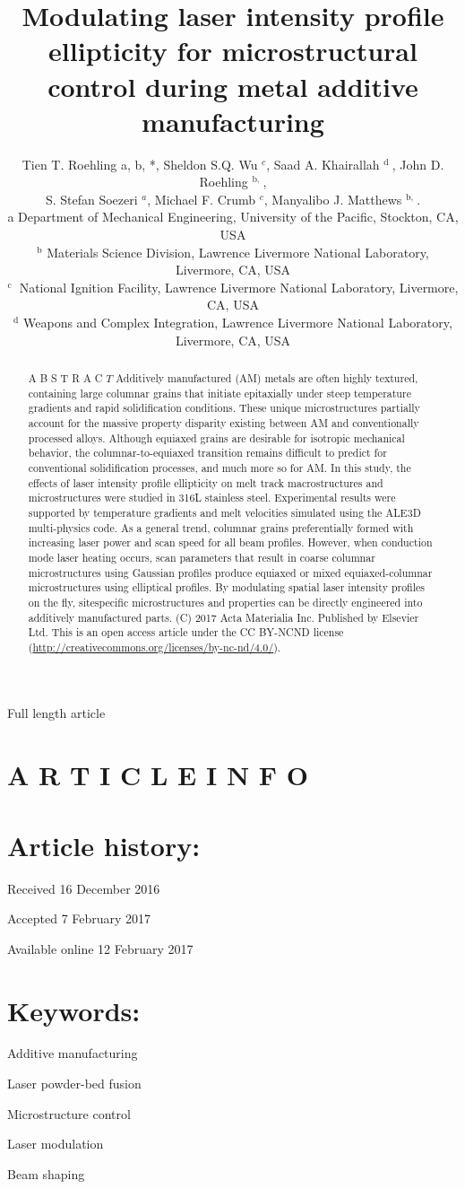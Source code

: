 \documentclass[10pt]{article}
\title{Modulating laser intensity profile ellipticity for microstructural control during metal additive manufacturing }
\author{Tien T. Roehling a, b, *, Sheldon S.Q. Wu ${ }^{c}$, Saad A. Khairallah ${ }^{\text {d }}$, John D. Roehling ${ }^{\text {b, }}$,\\
S. Stefan Soezeri ${ }^{a}$, Michael F. Crumb ${ }^{c}$, Manyalibo J. Matthews ${ }^{\text {b, }}$.\\
a Department of Mechanical Engineering, University of the Pacific, Stockton, CA, USA\\
${ }^{\mathrm{b}}$ Materials Science Division, Lawrence Livermore National Laboratory, Livermore, CA, USA\\
${ }^{\text {c }}$ National Ignition Facility, Lawrence Livermore National Laboratory, Livermore, CA, USA\\
${ }^{\mathrm{d}}$ Weapons and Complex Integration, Lawrence Livermore National Laboratory, Livermore, CA, USA}
\date{}
\begin{document}
\maketitle
Full length article



\section*{A R T I C L E I N F O}
\section*{Article history:}
Received 16 December 2016

Accepted 7 February 2017

Available online 12 February 2017

\section*{Keywords:}
Additive manufacturing

Laser powder-bed fusion

Microstructure control

Laser modulation

Beam shaping

\begin{abstract}
A B S T R A C $T$ Additively manufactured (AM) metals are often highly textured, containing large columnar grains that initiate epitaxially under steep temperature gradients and rapid solidification conditions. These unique microstructures partially account for the massive property disparity existing between AM and conventionally processed alloys. Although equiaxed grains are desirable for isotropic mechanical behavior, the columnar-to-equiaxed transition remains difficult to predict for conventional solidification processes, and much more so for AM. In this study, the effects of laser intensity profile ellipticity on melt track macrostructures and microstructures were studied in 316L stainless steel. Experimental results were supported by temperature gradients and melt velocities simulated using the ALE3D multi-physics code. As a general trend, columnar grains preferentially formed with increasing laser power and scan speed for all beam profiles. However, when conduction mode laser heating occurs, scan parameters that result in coarse columnar microstructures using Gaussian profiles produce equiaxed or mixed equiaxed-columnar microstructures using elliptical profiles. By modulating spatial laser intensity profiles on the fly, sitespecific microstructures and properties can be directly engineered into additively manufactured parts. (C) 2017 Acta Materialia Inc. Published by Elsevier Ltd. This is an open access article under the CC BY-NCND license (\href{http://creativecommons.org/licenses/by-nc-nd/4.0/}{http://creativecommons.org/licenses/by-nc-nd/4.0/}).
\end{abstract}
\end{document}
